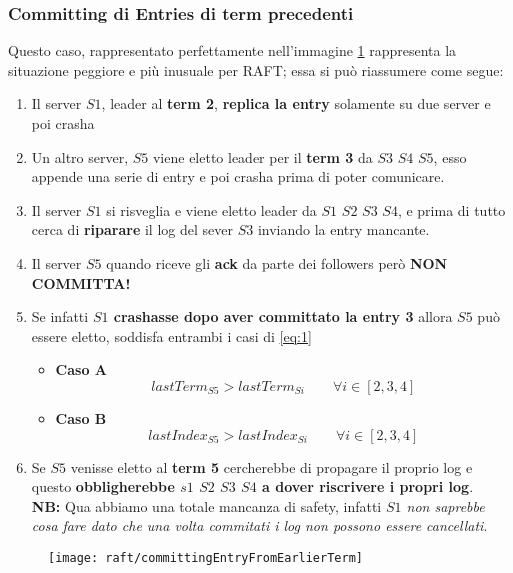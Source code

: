   \subsubsection{Committing di Entries di term precedenti}
  Questo caso, rappresentato perfettamente nell'immagine \ref{fig:figure12} rappresenta la situazione peggiore e più inusuale per RAFT; essa si può riassumere come segue:
  \begin{enumerate}
    \item{Il server $S1$, leader al \textbf{term 2}, \textbf{replica la entry} solamente su due server e poi crasha}
    \item{Un altro server, $S5$ viene eletto leader per il \textbf{term 3} da $S3$ $S4$ $S5$, esso appende una serie di entry e poi crasha prima di poter comunicare.}
    \item{Il server $S1$ si risveglia e viene eletto leader da $S1$ $S2$ $S3$ $S4$, e prima di tutto cerca di \textbf{riparare} il log del sever $S3$ inviando la entry mancante.}
    \item{Il server $S5$ quando riceve gli \textbf{ack} da parte dei followers però \textbf{NON COMMITTA!}}
    \item{Se infatti \textbf{$S1$ crashasse dopo aver committato la entry 3} allora $S5$ può essere eletto, soddisfa entrambi i casi di \ref{eq:1}}
    \begin{itemize}
      \item{\textbf{Caso A}}
      \[
        lastTerm_{S5} > lastTerm_{Si} \qquad \forall i \in [2,3,4]
      \]
      \item{\textbf{Caso B}}
      \[
        lastIndex_{S5} > lastIndex_{Si} \qquad \forall i \in [2,3,4]
      \]
    \end{itemize}
    \item{Se $S5$ venisse eletto al \textbf{term 5} cercherebbe di propagare il proprio log e questo \textbf{obbligherebbe $s1$ $S2$ $S3$ $S4$ a dover riscrivere i propri log}.\\
    \textbf{NB:} Qua abbiamo una totale mancanza di safety, infatti \emph{$S1$ non saprebbe cosa fare dato che una volta commitati i log non possono essere cancellati}}.
  \end{enumerate}
  \begin{figure}[H]
    \centering
    \texttt{[image: raft/committingEntryFromEarlierTerm]}
    \caption[stateDiagramCaption]{}
    \label{fig:figure12}
  \end{figure}

